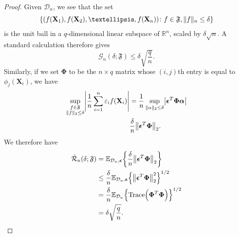 \documentclass[11pt]{article}
\newcommand{\bX}{\mathbf{X}}
\newcommand{\balpha}{\boldsymbol{\alpha}}
\newcommand{\beps}{\boldsymbol{\epsilon}}
\newcommand{\bPhi}{\boldsymbol{\Phi}}
\DeclarePairedDelimiter{\braces}{\lbrace}{\rbrace}
\DeclarePairedDelimiter{\paren}{(}{)}
\DeclarePairedDelimiter{\abs}{|}{|}
\DeclarePairedDelimiter{\norm}{\|}{\|}
\newcommand{\R}{\mathbb{R}}
\newcommand{\E}{\mathbb{E}}
\newcommand{\nsamples}{n}
\newcommand{\data}[1][n]{\mathcal{D}_{#1}}
\newcommand{\funcclass}{\mathfrak{F}}
\begin{document}
\begin{proof}
    Given $\data$, we see that the set
    \begin{equation}
        \braces*{\paren*{f(\bX_1),f(\bX_2),\ldots,f(\bX_n)} \colon f \in \funcclass, \norm{f}_\nsamples \leq \delta}
    \end{equation}
    is the unit ball in a $q$-dimensional linear subspace of $\R^\nsamples$, scaled by $\delta\sqrt{\nsamples}$.
    A standard calculation therefore gives
    \begin{equation}
        \mathcal{G}_n(\delta;\funcclass) \leq \delta\sqrt{\frac{q}{\nsamples}}.
    \end{equation}
    Similarly, if we set $\bPhi$ to be the $\nsamples \times q$ matrix whose $(i,j)$th entry is equal to $\phi_j(\bX_i)$, we have
    \begin{equation}
    \begin{split}
        \sup_{\substack{f \in \funcclass \\
    \norm{f}_2 \leq \delta}} \abs*{\frac{1}{n}\sum_{i=1}^n \varepsilon_i f(\bX_i)} & = \frac{1}{n}\sup_{\norm{\alpha}_2 \leq \delta}\abs*{\beps^T\bPhi\balpha} \\
    & \frac{\delta}{n}\norm*{\beps^T\bPhi}_2.
    \end{split}
    \end{equation}
    We therefore have
    \begin{equation}
        \begin{split}
            \bar{\mathcal{R}}_n(\delta;\funcclass) & = \E_{\data,\beps}\braces*{\frac{\delta}{n}\norm*{\beps^T\bPhi}_2} \\
            & \leq \frac{\delta}{n} \E_{\data,\beps}\braces*{\norm*{\beps^T\bPhi}_2^2}^{1/2} \\
            & = \frac{\delta}{n}\E_{\data}\braces*{\operatorname{Trace}\paren*{\bPhi^T\bPhi}}^{1/2} \\
            & = \delta\sqrt{\frac{q}{\nsamples}}.
        \end{split}
    \end{equation}


\end{proof}
\end{document}
